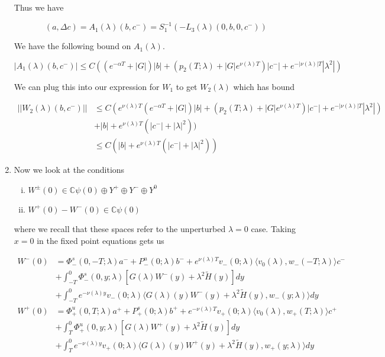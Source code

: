 \documentclass[12pt]{article}
\def\C{{\mathbb C}}
\begin{document}
\begin{enumerate}
Thus we have

\[
(a, \Delta c) = A_1(\lambda)(b, c^-) = S_1^{-1}(- L_3(\lambda)(0, b, 0, c^-))
\]


We have the following bound on $A_1(\lambda)$.

\[
|A_1(\lambda)(b, c^-)| \leq C ( (e^{-\alpha T} + |G|)|b| + ( p_2(T; \lambda) + |G|e^{\nu(\lambda)T})|c^-| + e^{-|\nu(\lambda)|T} |\lambda^2|)
\]

We can plug this into our expression for $W_1$ to get $W_2(\lambda)$ which has bound


\begin{align*}
||W_2(\lambda)(b,c^-)|| &\leq C (e^{\nu(\lambda)T}(e^{-\alpha T} + |G|)|b| + ( p_2(T; \lambda) + |G|e^{\nu(\lambda)T})|c^-| + e^{-|\nu(\lambda)|T} |\lambda^2|) \\
&+ |b| + e^{\nu(\lambda)T}(|c^-| + |\lambda|^2)) \\
&\leq C (|b| + e^{\nu(\lambda)T}(|c^-| + |\lambda|^2))
\end{align*}

\item Now we look at the conditions

\begin{enumerate}[(i)]
\item $W^\pm(0) \in \C \psi(0) \oplus Y^+ \oplus Y^- \oplus Y^0$
\item $W^+(0) - W^-(0) \in \C \psi(0)$ 
\end{enumerate}

where we recall that these spaces refer to the unperturbed $\lambda = 0$ case. Taking $x = 0$ in the fixed point equations gets us

\begin{align*}
W^-(0) &= \Phi^s_-(0, -T; \lambda)a^- + P^u_-(0; \lambda)b^- + e^{\nu(\lambda)T} v_-(0; \lambda) \langle v_0(\lambda), w_-(-T; \lambda) \rangle c^- \\
&+ \int_{-T}^0 \Phi^s_-(0, y; \lambda) [ G(\lambda)W^-(y) + \lambda^2 \tilde{H}(y) ] dy \\
&+ \int_{-T}^0 
e^{-\nu(\lambda)y} v_-(0; \lambda) \langle G(\lambda)(y)W^-(y) + \lambda^2 \tilde{H}(y), w_-(y; \lambda) \rangle dy \\
W^+(0) &= \Phi^u_+(0, T; \lambda)a^+ + P^s_+(0; \lambda)b^+ + e^{-\nu(\lambda)T} v_+(0; \lambda) \langle v_0(\lambda), w_+(T; \lambda) \rangle c^+ \\
&+ \int_T^0 \Phi^u_+(0, y; \lambda) [ G(\lambda)W^+(y) + \lambda^2 \tilde{H}(y) ] dy \\
&+ \int_T^0 e^{-\nu(\lambda)y} v_+(0; \lambda) \langle G(\lambda)(y)W^+(y) + \lambda^2 \tilde{H}(y), w_+(y; \lambda) \rangle dy
\end{align*}


\end{enumerate}
\end{document}
